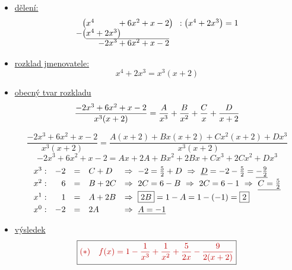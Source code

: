 \documentclass[11pt,a4paper]{article}
\newcommand{\vysl}[1]{\boxed{\color{red!75!black}#1}}
\newcommand{\pozn}[1]{{\color{red!75!black}#1}}
\newcommand{\tm}[2]{\tikz[remember picture, baseline=(#1.base)]\node[inner sep=0pt, outer sep=1pt] (#1) {$\displaystyle #2$};}
\begin{document}
\begin{itemize}
\item \underline{dělení:}
\[
\begin{array}{@{}r@{}r@{}r@{}r@{}r@{}r@{}l@{}}
\bigl( & x^4 & & {}+6x^2 & {}+x & {}-2\rlap{$\bigr)$} & \quad{}:\left(x^4+2x^3\right)=1\\
-\bigl( & x^4 & {}+2x^3\rlap{$\bigr)$} & & & &\\ \cline{2-6}
 & & -2x^3 & {}+6x^2 & {}+x & {}-2 &
\end{array}
\]
\item \underline{rozklad jmenovatele:}
\[ x^4+2x^3 = x^3(x+2) \]
\item \underline{obecný tvar rozkladu}
\[
\tm{og}{\frac{-2x^3+6x^2+x-2}{x^3(x+2)}} = \frac{A}{x^3}+\frac{B}{x^2}+\frac{C}{x}+\frac{D}{x+2}
\]
\[
\frac{-2x^3+6x^2+x-2}{x^3(x+2)} = \frac{A(x+2)+Bx(x+2)+Cx^2(x+2)+Dx^3}{x^3(x+2)}
\]
\[
-2x^3+6x^2+x-2 = Ax+2A+Bx^2+2Bx+Cx^3+2Cx^2+Dx^3
\]
\[
\begin{array}{lrcll}
x^3: & -2 &=& C+D & \Rightarrow\ -2=\frac52+D \ \Rightarrow\ \underline{D}=-2-\frac52=\underline{-\frac92}\\[3pt]
x^2: & 6 &=& B+2C & \Rightarrow\ 2C=6-B \ \Rightarrow\ 2C=6-1 \ \Rightarrow\ \underline{C=\frac52}\\[3pt]
x^1: & 1 &=& A+2B & \Rightarrow\ \boxed{2B}=1-A=1-(-1)=\tm{b2}{\boxed{2}}\\[3pt]
x^0: & -2 &=& 2A & \Rightarrow\ \underline{A=-1}
\end{array}
\]
\vspace{0.6cm}
\item \pozn{\underline{výsledek}}
\[
\vysl{(*)\quad f(x) = 1-\frac{1}{x^3}+\frac{1}{x^2}+\frac{5}{2x}-\frac{9}{2(x+2)}}
\]
\end{itemize}
\end{document}
